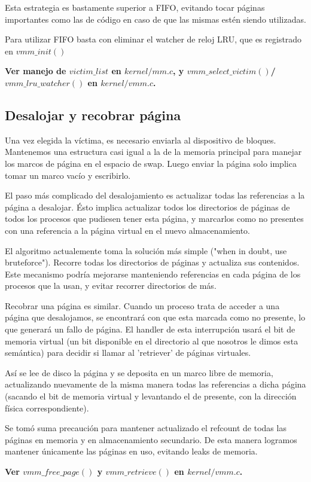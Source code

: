 Esta estrategia es bastamente superior a FIFO, evitando tocar páginas
importantes como las de código en caso de que las mismas estén siendo
utilizadas.

Para utilizar FIFO basta con eliminar el watcher de reloj LRU, que es registrado
en $vmm\_init()$

\textbf{Ver manejo de $victim\_list$ en $kernel/mm.c$, y
$vmm\_select\_victim()$/$vmm\_lru\_watcher()$ en $kernel/vmm.c$.}

\subsection{Desalojar y recobrar página}

Una vez elegida la víctima, es necesario enviarla al dispositivo de bloques.
Mantenemos una estructura casi igual a la de la memoria principal para manejar
los marcos de página en el espacio de swap. Luego enviar la página solo implica
tomar un marco vacío y escribirlo.

El paso más complicado del desalojamiento es actualizar todas las referencias a
la página a desalojar. Ésto implica actualizar todos los directorios de páginas
de todos los procesos que pudiesen tener esta página, y marcarlos como no
presentes con una referencia a la página virtual en el nuevo almacenamiento.

El algoritmo actualemente toma la solución más simple ("when in doubt, use
bruteforce"). Recorre todas los directorios de páginas y actualiza sus
contenidos. Este mecanismo podría mejorarse manteniendo referencias en cada
página de los procesos que la usan, y evitar recorrer directorios de más.

Recobrar una página es similar. Cuando un proceso trata de acceder a una página
que desalojamos, se encontrará con que esta marcada como no presente, lo que
generará un fallo de página. El handler de esta interrupción usará el bit de
memoria virtual (un bit disponible en el directorio al que nosotros le dimos
esta semántica) para decidir si llamar al 'retriever' de páginas virtuales.

Así se lee de disco la página y se deposita en un marco libre de memoria,
actualizando nuevamente de la misma manera todas las referencias a dicha página
(sacando el bit de memoria virtual y levantando el de presente, con la dirección
física correspondiente).

Se tomó suma precaución para mantener actualizado el refcount de todas las
páginas en memoria y en almacenamiento secundario. De esta manera logramos
mantener únicamente las páginas en uso, evitando leaks de memoria.

\textbf{Ver $vmm\_free\_page()$ y $vmm\_retrieve()$ en $kernel/vmm.c$.}

